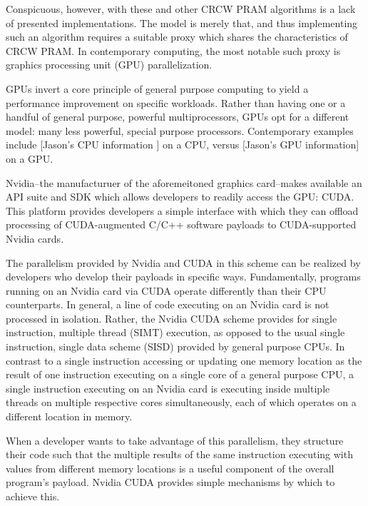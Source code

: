 \documentclass[letterpaper, 12pt]{article}
\begin{document}
Conspicuous, however, with these and other CRCW PRAM algorithms is a lack of presented implementations.  The model is merely that, and thus implementing such an algorithm requires a suitable proxy which shares the characteristics of CRCW PRAM.  In contemporary computing, the most notable such proxy is graphics processing unit (GPU) parallelization.

GPUs invert a core principle of general purpose computing to yield a performance improvement on specific workloads.  Rather than having one or a handful of general purpose, powerful multiprocessors, GPUs opt for a different model: many less powerful, special purpose processors.  Contemporary examples include [Jason's CPU information ] on a CPU, versus [Jason's GPU information] on a GPU.  

Nvidia--the manufacturuer of the aforemeitoned graphics card--makes available an API suite and SDK which allows developers to readily access the GPU: CUDA.  This platform provides developers a simple interface with which they can offload processing of CUDA-augmented C/C++ software payloads to CUDA-supported Nvidia cards.

The parallelism provided by Nvidia and CUDA in this scheme can be realized by developers who develop their payloads in specific ways.  Fundamentally, programs running on an Nvidia card via CUDA operate differently than their  CPU counterparts.  In general, a line of code executing on an Nvidia card is not processed in isolation.  Rather, the Nvidia CUDA scheme provides for single instruction, multiple thread (SIMT) execution, as opposed to the usual single instruction, single data scheme (SISD) provided by general purpose CPUs.  In contrast to a single instruction accessing or updating one memory location as the result of one instruction executing on a single core of a general purpose CPU, a single instruction executing on an Nvidia card is executing inside multiple threads on multiple respective cores simultaneously, each of which operates on a different location in memory.

When a developer wants to take advantage of this parallelism, they structure their code such that the multiple results of the same instruction executing with values from different memory locations is a useful component of the overall program's payload.  Nvidia CUDA provides simple mechanisms by which to achieve this.
\end{document}
